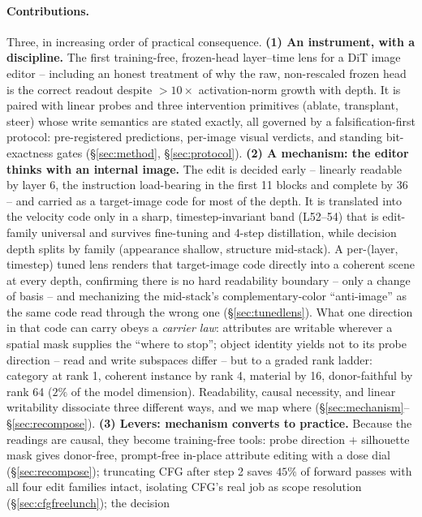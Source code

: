 \documentclass[10pt,twocolumn]{article}
\begin{document}
\paragraph{Contributions.} Three, in increasing order of practical
consequence. \textbf{(1) An instrument, with a discipline.} The first
training-free, frozen-head layer--time lens for a DiT image editor --
including an honest treatment of why the raw, non-rescaled frozen head
is the correct readout despite $>$$10\times$ activation-norm growth
with depth. It is paired with linear probes and three intervention
primitives (ablate, transplant, steer) whose write semantics are stated
exactly, all governed by a falsification-first protocol: pre-registered
predictions, per-image visual verdicts, and standing bit-exactness
gates (\S\ref{sec:method}, \S\ref{sec:protocol}). \textbf{(2) A
mechanism: the editor thinks with an internal image.} The edit is
decided early -- linearly readable by layer 6, the instruction
load-bearing in the first 11 blocks and complete by 36 -- and carried
as a target-image code for most of the depth. It is translated into
the velocity code only in a sharp, timestep-invariant band (L52--54)
that is edit-family universal and survives fine-tuning and 4-step
distillation, while decision depth splits by family (appearance
shallow, structure mid-stack). A per-(layer, timestep) tuned lens
renders that target-image code directly into a coherent scene at every
depth, confirming there is no hard readability boundary -- only a
change of basis -- and mechanizing the mid-stack's complementary-color
``anti-image'' as the same code read through the wrong one
(\S\ref{sec:tunedlens}). What one direction in that code can
carry obeys a \emph{carrier law}: attributes are writable wherever a
spatial mask supplies the ``where to stop''; object identity yields
not to its probe direction -- read and write subspaces differ -- but to
a graded rank ladder: category at rank 1, coherent instance by rank 4,
material by 16, donor-faithful by rank 64 ($2\%$ of the model
dimension). Readability, causal necessity, and linear writability
dissociate three different ways, and we map where
(\S\ref{sec:mechanism}--\S\ref{sec:recompose}). \textbf{(3) Levers:
mechanism converts to practice.} Because the readings are causal, they
become training-free tools: probe direction $+$ silhouette mask gives
donor-free, prompt-free in-place attribute editing with a dose dial
(\S\ref{sec:recompose}); truncating CFG after step 2 saves $45\%$ of
forward passes with all four edit families intact, isolating CFG's real
job as scope resolution (\S\ref{sec:cfgfreelunch}); the decision
$$
\end{document}
